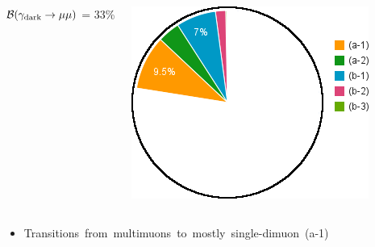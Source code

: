 \documentclass[compress]{beamer}
\newcommand{\s}[1]{{\mbox{\scriptsize #1}}}
\begin{document}
\begin{frame}
\begin{columns}
\centering $\mathcal{B}(\gamma_\s{dark} \to \mu\mu)$ = 33\%

\vspace{0.2 cm}
\includegraphics[width=0.9\linewidth]{chart2d_Br33.png}
\end{columns}

\vspace{0.3 cm}
\begin{itemize}
\item \mbox{Transitions from multimuons to mostly single-dimuon (a-1)\hspace{-1 cm}}
\end{itemize}
\end{frame}

\end{document}
